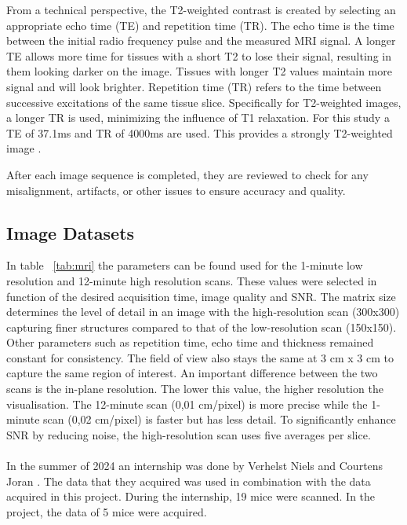 \documentclass[twocolumn]{article}
\begin{document}
From a technical perspective, the T2-weighted contrast is created by selecting an appropriate echo time (TE) and repetition time (TR). 
The echo time is the time between the initial radio frequency pulse and the measured MRI signal. 
A longer TE allows more time for tissues with a short T2 to lose their signal, resulting in them looking darker on the image. 
Tissues with longer T2 values maintain more signal and will look brighter. Repetition time (TR) refers to the time between successive excitations of the same tissue slice. 
Specifically for T2-weighted images, a longer TR is used, minimizing the influence of T1 relaxation. For this study a TE of 37.1ms and TR of 4000ms are used. 
This provides a strongly T2-weighted image \cite{chavhan2009t2star}\cite{mrimaster2024}.  


After each image sequence is completed, they are reviewed to check for any misalignment, artifacts, or other issues to ensure accuracy and quality. 

\subsection{Image Datasets}

In table ~\ref{tab:mri} the parameters can be found used for the 1-minute low resolution and 12-minute high resolution scans. 
These values were selected in function of the desired acquisition time, image quality and SNR. 
The matrix size determines the level of detail in an image with the high-resolution scan (300x300) capturing finer structures compared to that of the low-resolution scan (150x150). 
Other parameters such as repetition time, echo time and thickness remained constant for consistency. The field of view also stays the same at 3 cm x 3 cm to capture the same region of interest. 
An important difference between the two scans is the in-plane resolution. The lower this value, the higher resolution the visualisation. 
The 12-minute scan (0,01 cm/pixel) is more precise while the 1-minute scan (0,02 cm/pixel) is faster but has less detail. 
To significantly enhance SNR by reducing noise, the high-resolution scan uses five averages per slice.\\
\\
In the summer of 2024 an internship was done by Verhelst Niels and Courtens Joran \cite{verhelst2025denoising}. 
The data that they acquired was used in combination with the data acquired in this project. During the internship, 19 mice were scanned. 
In the project, the data of 5 mice were acquired.
 
\end{document}
